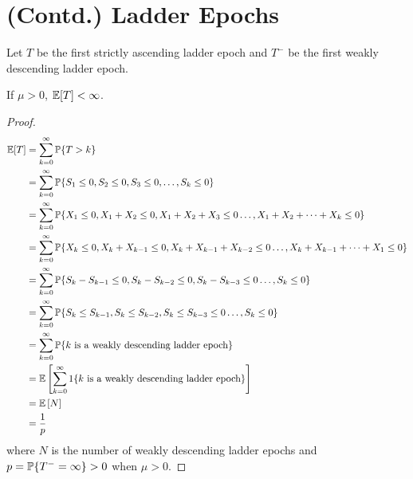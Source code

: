 \documentclass[all-lectures.tex]{subfiles}
\begin{document}

\setcounter{section}{1}
\setcounter{subsection}{1}
\section*{}
\chr
\section{(Contd.) Ladder Epochs}
Let $T$ be the first strictly ascending ladder epoch and $T^-$ be the first  weakly descending ladder epoch.
\begin{lem}
If $\mu > 0$, $\E[T] < \infty$. 
\begin{proof}
\begin{align*}
\E[T] &= \sum_{k=0}^\infty \P\{T > k\} \\
&= \sum_{k=0}^\infty \P\{S_1\leq 0,S_2 \leq 0,S_3 \leq 0,\dots,S_k \leq 0\} \\
&= \sum_{k=0}^\infty \P\{X_1 \leq 0,X_1+X_2 \leq 0,X_1+X_2+X_3 \leq 0\dots,X_1+X_2+\dots+X_k \leq 0\} \\
&= \sum_{k=0}^\infty \P\{X_k \leq 0,X_{k}+X_{k-1} \leq 0,X_k+X_{k-1}+X_{k-2} \leq 0\dots,X_k+X_{k-1}+\dots+X_1 \leq 0\} \\
&= \sum_{k=0}^\infty \P\{S_k - S_{k-1} \leq 0,S_k - S_{k-2} \leq 0,S_k - S_{k-3} \leq 0\dots,S_k \leq 0\} \\
&= \sum_{k=0}^\infty \P\{S_k \leq S_{k-1},S_k \leq S_{k-2} ,S_k \leq S_{k-3} \leq 0\dots,S_k \leq 0\} \\
&= \sum_{k=0}^\infty \P\{\text{$k$ is a weakly descending ladder epoch}\} \\
&= \E \left[ \sum_{k=0}^\infty 1\{\text{$k$ is a weakly descending ladder epoch}\} \right]\\
&= \E \left[ N \right]\\
&= \frac{1}{p}
\end{align*}
where $N$ is the number of weakly descending ladder epochs and $p = \P\{T^- = \infty\} > 0$ when $\mu > 0$.
\end{proof}
\end{lem}
\end{document}
